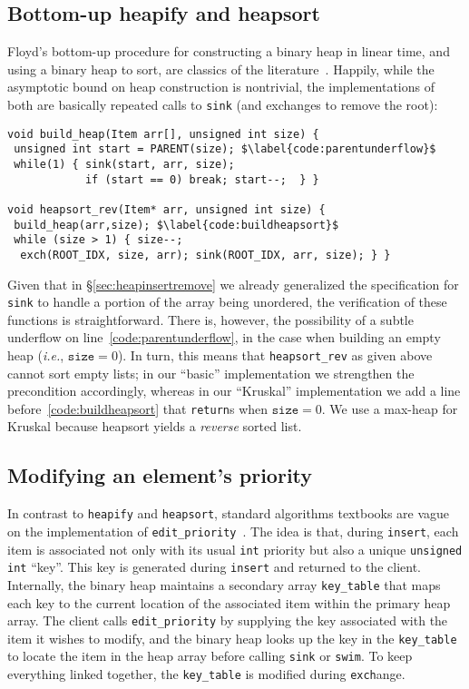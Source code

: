 \lstset{style=myTinyStyle}

\subsection{Bottom-up heapify and heapsort}
\label{sec:heapsort}

Floyd's bottom-up procedure for constructing a binary heap in linear time, and using a binary heap to sort, are classics of the literature~\cite{clrs,sedgewick}.  Happily, while the asymptotic bound on heap construction is nontrivial, the implementations of both are basically repeated calls to \texttt{sink} (and exchanges to remove the root):
\begin{lstlisting}
void build_heap(Item arr[], unsigned int size) {
 unsigned int start = PARENT(size); $\label{code:parentunderflow}$
 while(1) { sink(start, arr, size);
            if (start == 0) break; start--;  } }

void heapsort_rev(Item* arr, unsigned int size) {
 build_heap(arr,size); $\label{code:buildheapsort}$
 while (size > 1) { size--;
  exch(ROOT_IDX, size, arr); sink(ROOT_IDX, arr, size); } }
\end{lstlisting}
Given that in \S\ref{sec:heapinsertremove} we already generalized the specification for \texttt{sink} to handle a portion of the array being unordered, the verification of these functions is straightforward.  There is, however, the possibility of a subtle underflow on line~\ref{code:parentunderflow}, in the case when building an empty heap (\emph{i.e.}, $\texttt{size}=0$).  In turn, this means that \texttt{heapsort\_rev} as given above cannot sort empty lists; in our ``basic'' implementation we strengthen the precondition accordingly, whereas in our ``Kruskal'' implementation we add a line before~\ref{code:buildheapsort} that \texttt{return}s when $\texttt{size}=0$.  We use a max-heap for Kruskal because heapsort yields a \emph{reverse} sorted list.

\subsection{Modifying an element's priority}
\label{sec:modpri}

In contrast to \texttt{heapify} and \texttt{heapsort}, standard algorithms textbooks are vague on the implementation of \texttt{edit\_priority}~\cite{clrs,sedgewick}.  The idea is that, during \texttt{insert}, each item is associated not only with its usual \texttt{int} priority
but also a unique \texttt{unsigned int} ``key''.
This key is generated during \texttt{insert} and returned to the client.
Internally, the binary heap maintains a secondary array \texttt{key\_table} that maps each key to the current location of the associated item within the primary heap array. The client calls \texttt{edit\_priority} by supplying the key associated with the item
it wishes to modify, and the binary heap looks up the key in the \texttt{key\_table} to
locate the item in the heap array before calling \texttt{sink} or \texttt{swim}. To keep everything linked together, the \texttt{key\_table} is modified during \texttt{exch}ange.

